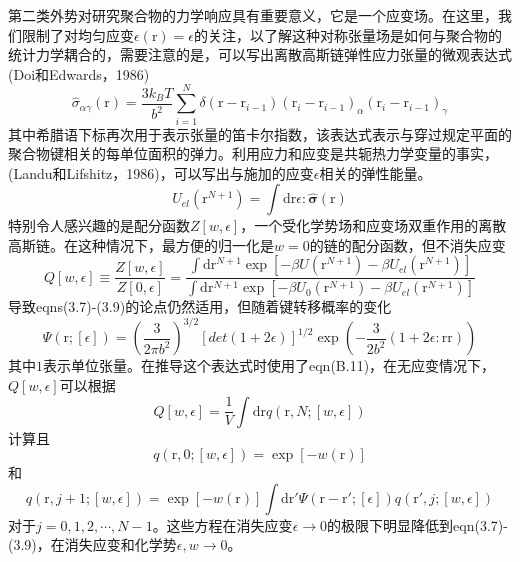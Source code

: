 第二类外势对研究聚合物的力学响应具有重要意义，它是一个应变场。在这里，我们限制了对均匀应变$\epsilon(\mathrm{r})=\epsilon$的关注，以了解这种对称张量场是如何与聚合物的统计力学耦合的，需要注意的是，可以写出离散高斯链弹性应力张量的微观表达式(Doi和Edwards，1986)
\begin{equation}
\hat{\sigma}_{\alpha\gamma}(\mathrm{r})=\frac{3k_BT}{b^2}\sum\limits_{i=1}^N\delta(\mathrm{r}-\mathrm{r}_{i-1})(\mathrm{r}_{i}-\mathrm{r}_{i-1})_{\alpha}(\mathrm{r}_i-\mathrm{r}_{i-1})_{\gamma}
\end{equation}
其中希腊语下标再次用于表示张量的笛卡尔指数，该表达式表示与穿过规定平面的聚合物键相关的每单位面积的弹力。利用应力和应变是共轭热力学变量的事实，(Landu和Lifshitz，1986)，可以写出与施加的应变$\epsilon$相关的弹性能量。
\begin{equation}
U_{el}(\mathrm{r}^{N+1})=\int\mathrm{d}\mathrm{r}\epsilon:\hat{\boldsymbol{\sigma}}(\mathrm{r})
\end{equation}
特别令人感兴趣的是配分函数$Z[w,\epsilon]$，一个受化学势场和应变场双重作用的离散高斯链。在这种情况下，最方便的归一化是$w=0$的链的配分函数，但不消失应变
\begin{equation}
Q[w,\epsilon]\equiv\frac{Z[w,\epsilon]}{Z[0,\epsilon]}=\frac{\int\mathrm{d}\mathrm{r}^{N+1}\exp[-\beta U(\mathrm{r}^{N+1})-\beta U_{el}(\mathrm{r}^{N+1})]}{\int\mathrm{d}\mathrm{r}^{N+1}\exp[-\beta U_0(\mathrm{r}^{N+1})-\beta U_{el}(\mathrm{r}^{N+1})]}
\end{equation}
导致eqns(3.7)-(3.9)的论点仍然适用，但随着键转移概率的变化
\begin{equation}
\Psi(\mathrm{r};[\epsilon])=\left(\frac{3}{2\pi b^2}\right)^{3/2}[det(1+2\epsilon)]^{1/2}\exp\left(-\frac{3}{2b^2}(1+2\epsilon:\mathrm{r}\mathrm{r})\right)
\end{equation}
其中$1$表示单位张量。在推导这个表达式时使用了eqn(B.11)，在无应变情况下，$Q[w,\epsilon]$可以根据
\begin{equation}
Q[w,\epsilon]=\frac{1}{V}\int\mathrm{d}\mathrm{r}q(\mathrm{r},N;[w,\epsilon])
\end{equation}
计算且
\begin{equation}
q(\mathrm{r},0;[w,\epsilon])=\exp[-w(\mathrm{r})]
\end{equation}
和
\begin{equation}
q(\mathrm{r},j+1;[w,\epsilon])=\exp[-w(\mathrm{r})]\int\mathrm{d}\mathrm{r}'\Psi(\mathrm{r}-\mathrm{r}';[\epsilon])q(\mathrm{r}',j;[w,\epsilon])
\end{equation}
对于$j=0,1,2,\cdots,N-1$。这些方程在消失应变$\epsilon\rightarrow 0$的极限下明显降低到eqn(3.7)-(3.9)，在消失应变和化学势$\epsilon,w\rightarrow 0$。
